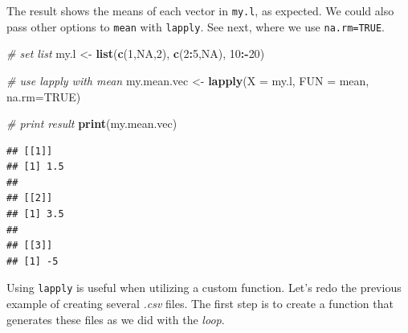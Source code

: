 \documentclass[11pt,]{book}
\newenvironment{Shaded}{\begin{snugshade}}{\end{snugshade}}
\newcommand{\KeywordTok}[1]{\textcolor[rgb]{0.27,0.27,0.27}{\textbf{#1}}}
\newcommand{\DataTypeTok}[1]{\textcolor[rgb]{0.27,0.27,0.27}{#1}}
\newcommand{\DecValTok}[1]{\textcolor[rgb]{0.06,0.06,0.06}{#1}}
\newcommand{\StringTok}[1]{\textcolor[rgb]{0.5,0.5,0.5}{#1}}
\newcommand{\CommentTok}[1]{\textcolor[rgb]{0.56,0.35,0.01}{\textit{#1}}}
\newcommand{\OtherTok}[1]{\textcolor[rgb]{0.56,0.35,0.01}{#1}}
\newcommand{\OperatorTok}[1]{\textcolor[rgb]{0.81,0.36,0.00}{\textbf{#1}}}
\newcommand{\NormalTok}[1]{#1}
\begin{document}
The result shows the means of each vector in \texttt{my.l}, as expected.
We could also pass other options to \texttt{mean} with \texttt{lapply}.
See next, where we use \texttt{na.rm=TRUE}.

\begin{Shaded}
\begin{Highlighting}[]
\CommentTok{# set list}
\NormalTok{my.l <-}\StringTok{ }\KeywordTok{list}\NormalTok{(}\KeywordTok{c}\NormalTok{(}\DecValTok{1}\NormalTok{,}\OtherTok{NA}\NormalTok{,}\DecValTok{2}\NormalTok{), }\KeywordTok{c}\NormalTok{(}\DecValTok{2}\OperatorTok{:}\DecValTok{5}\NormalTok{,}\OtherTok{NA}\NormalTok{), }\DecValTok{10}\OperatorTok{:-}\DecValTok{20}\NormalTok{)}

\CommentTok{# use lapply with mean}
\NormalTok{my.mean.vec <-}\StringTok{ }\KeywordTok{lapply}\NormalTok{(}\DataTypeTok{X =}\NormalTok{ my.l, }\DataTypeTok{FUN =}\NormalTok{ mean, }\DataTypeTok{na.rm=}\OtherTok{TRUE}\NormalTok{)}

\CommentTok{# print result}
\KeywordTok{print}\NormalTok{(my.mean.vec)}
\end{Highlighting}
\end{Shaded}

\begin{verbatim}
## [[1]]
## [1] 1.5
## 
## [[2]]
## [1] 3.5
## 
## [[3]]
## [1] -5
\end{verbatim}

Using \texttt{lapply} is useful when utilizing a custom function. Let's
redo the previous example of creating several \emph{.csv} files. The
first step is to create a function that generates these files as we did
with the \emph{loop}.
\end{document}
